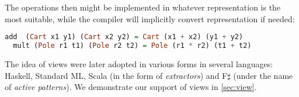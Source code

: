 \noindent
The operations then might be implemented in whatever representation is the most 
suitable, while the compiler will implicitly convert representation if needed:

\begin{lstlisting}[language=Haskell,columns=flexible]
  add  (Cart x1 y1) (Cart x2 y2) = Cart (x1 + x2) (y1 + y2)
  mult (Pole r1 t1) (Pole r2 t2) = Pole (r1 * r2) (t1 + t2)
\end{lstlisting}

\noindent
The idea of views were later adopted in various forms in several languages: 
Haskell\cite{views96}, Standard ML\cite{views98}, Scala (in the form of 
\emph{extractors}\cite{EmirThesis}) and F$\sharp$ (under the name of 
\emph{active patterns}\cite{Syme07}). We demonstrate our support of views in 
\textsection\ref{sec:view}.
